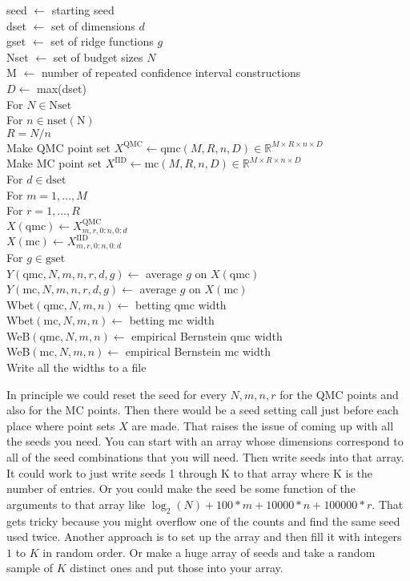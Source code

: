 \documentclass{article}
\newcommand{\real}{\mathbb{R}}
\newcommand{\tab}{\hspace*{0.6cm}}
\newcommand{\qmc}{\mathrm{qmc}}
\newcommand{\mc}{\mathrm{mc}}
\begin{document}
\par\noindent
seed $\gets$ starting seed\\
dset $\gets$ set of dimensions $d$\\
gset $\gets$ set of ridge functions $g$\\
Nset $\gets$ set of budget sizes $N$\\
M $\gets$ number of repeated confidence interval constructions\\
$D\gets$ max(dset)\\
For $N\in\mathrm{N set}$\\
\tab For $n\in\mathrm{n set(N)}$\\
\tab\tab $R=N/n$\\
\tab\tab Make QMC point set $X^\mathrm{QMC} \gets \qmc(M,R,n,D)\in\real^{M \times R \times  n\times D}$\\
\tab\tab Make MC point set $X^\mathrm{IID} \gets \mc(M,R,n,D)\in\real^{M \times R \times n\times D}$\\
\tab\tab For $d\in\mathrm{dset}$\\
\tab\tab\tab For $m=1,\dots,M$\\
\tab\tab\tab\tab For $r=1,\dots,R$\\
\tab\tab\tab\tab\tab $X(\qmc)\gets X^\mathrm{QMC}_{m,r,0:n,0:d}$ \\
\tab\tab\tab\tab\tab $X(\mc)\gets X^\mathrm{IID}_{m,r,0:n,0:d}$\\
\tab\tab\tab\tab\tab For $g\in\mathrm{gset}$\\
\tab\tab\tab\tab\tab\tab $Y(\qmc,N,m,n,r,d,g)\gets$ average $g$ on $X(\qmc)$\\
\tab\tab\tab\tab\tab\tab $Y(\mc,N,m,n,r,d,g)\gets$ average $g$ on $X(\mc)$\\
\tab\tab\tab Wbet$(\qmc,N,m,n)\gets$ betting qmc width\\
\tab\tab\tab Wbet$(\mc,N,m,n)\gets$ betting mc width\\
\tab\tab\tab WeB$(\qmc,N,m,n)\gets$ empirical Bernstein qmc width\\
\tab\tab\tab WeB$(\mc,N,m,n)\gets$ empirical Bernstein mc width\\
Write all the widths to a file

\bigskip

In principle we could reset the seed
for every $N,m,n,r$ for the QMC points
and also for the MC points.  Then there
would be a seed setting call just before each place
where point sets $X$ are made.
That raises the issue of coming up with all
the seeds you need.  You can start with an
array whose dimensions correspond to all of the
seed combinations that you will need.  Then
write seeds into that array.  It could work to
just write seeds 1 through K to that array
where K is the number of entries.  Or you could
make the seed be some function of the arguments
to that array like $\log_2(N)+100*m+10000*n+100000*r$.
That gets tricky because you might overflow one
of the counts and find the same seed used twice.
Another approach is to set up the array and
then fill it with integers $1$ to $K$ in random
order.  Or make a huge array of seeds and take
a random sample of $K$ distinct ones and put 
those into your array.
\end{document}
